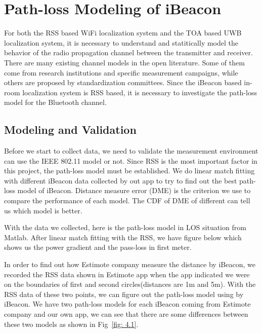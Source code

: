 \documentclass[12pt]{report}
\begin{document}
\section{Path-loss Modeling of iBeacon}
For both the RSS based WiFi localization system and the TOA based UWB localization system, it is necessary to understand and statitically model the behavior of the radio propagation channel between the transmitter and receiver. There are many existing channel models in the open literature. Some of them come from research institutions and specific measurement campaigns, while others are proposed by standardization committees. Since the iBeacon based in-room localization system is RSS based, it is necessary to investigate the path-loss model for the Bluetooth channel. 

\subsection{Modeling and Validation}
Before we start to collect data, we need to validate the measurement environment can use the IEEE 802.11 model or not. Since RSS is the most important factor in this project, the path-loss model must be established. We do linear match fitting with different iBeacon data collected by out app to try to find out the best path-loss model of iBeacon. Distance measure error (DME) is the criterion we use to compare the performance of each model. The CDF of DME of different can tell us which model is better.

With the data we collected, here is the path-loss model in LOS situation from Matlab. After linear match fitting with the RSS, we have figure below which shows us the power gradient and the pass-loss in first meter.

In order to find out how Estimote company measure the distance by iBeacon, we recorded the RSS data shown in Estimote app when the app indicated we were on the boundaries of first and second circles(distances are 1m and 5m). With the RSS data of these two points, we can figure out the path-loss model using by iBeacon. We have two path-loss models for each iBeacon coming from Estimote company and our own app, we can see that there are some differences between these two models as shown in Fig~\ref{fig: 4.1}.
\end{document}
